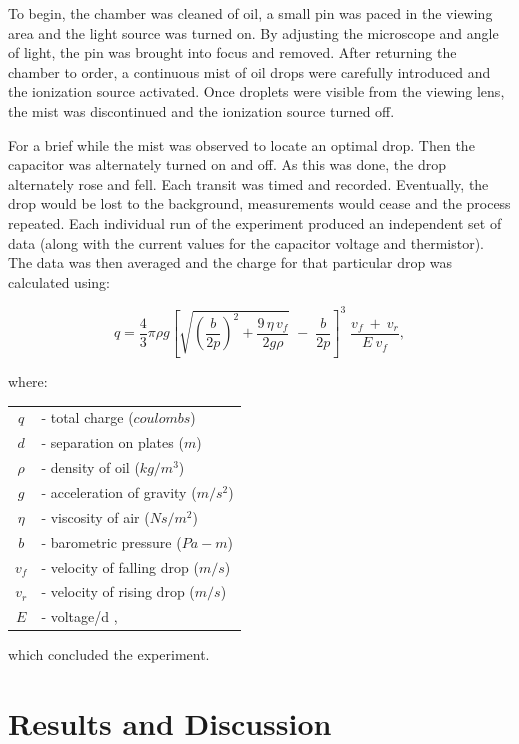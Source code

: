 \documentclass[twocolumn,secnumarabic,amssymb, nobibnotes, aps, pra]{revtex4}
\begin{document}
To begin, the chamber was cleaned of oil, a small pin was paced in the viewing area and the light source was turned on. By adjusting the microscope and angle of light, the pin was brought into focus and removed. After returning the chamber to order, a continuous mist of oil drops were carefully introduced and the ionization source activated. Once droplets were visible from the viewing lens, the mist was discontinued and the ionization source turned off.

For a brief while the mist was observed to locate an optimal drop. Then the capacitor was alternately turned on and off. As this was done, the drop alternately rose and fell. Each transit was timed and recorded. Eventually, the drop would be lost to the background, measurements would cease and the process repeated. Each individual run of the experiment produced an independent set of data (along with the current values for the capacitor voltage and thermistor). The data was then averaged and the charge for that particular drop was calculated using:

\begin{equation}
q= \frac{4}{3} \pi\rho g\left [ \sqrt{\left ( \frac{b}{2p} \right )^{2}+\frac{9\, \eta \, v_{f}}{2g\rho }} \; -\; \frac{b}{2p}\right ]^{3}\; \frac{v_{f}\: +\: v_{r}}{E\: v_{f}},
\end{equation}

where:

\begin{table} [htb]
\begin{tabular}{cl}
$q$ & - total charge ($coulombs$)\\
$d$ & - separation on plates ($m$)\\
$\rho$ & - density of oil ($kg/m^{3}$)\\
$g$ & - acceleration of gravity ($m/s^{2}$)\\
$\eta$ & - viscosity of air ($Ns/m^{2}$)\\
$b$ & - barometric pressure ($Pa-m$)\\
$v_{f}$ & - velocity of falling drop ($m/s$)\\
$v_{r}$ & - velocity of rising drop ($m/s$)\\
$E$ & - voltage/d ,\\
\end{tabular}
\end{table}
which concluded the experiment.


\section{Results and Discussion}
\end{document}
